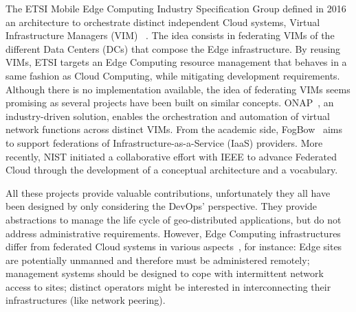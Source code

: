 


%
The ETSI Mobile Edge Computing Industry Specification Group
defined in 2016 an architecture to orchestrate distinct
independent Cloud systems, \aka Virtual
Infrastructure Managers (VIM) ~\cite{7574435}.
%
The idea consists in federating VIMs of the different Data Centers (DCs) that
compose the Edge infrastructure.  By reusing VIMs, ETSI targets an Edge
Computing resource management that behaves in a same fashion as Cloud
Computing, while mitigating development requirements.
%
Although there is no implementation available, the idea of federating
VIMs seems promising as several projects have been built on similar
concepts. ONAP~\cite{onap}, an industry-driven solution,
enables the orchestration and automation of virtual network functions
across distinct VIMs. From the academic side, FogBow~\cite{brasileiro2016fogbow} aims to support federations
of Infrastructure-as-a-Service (IaaS) providers. More recently, NIST
initiated a collaborative effort with IEEE to advance Federated
Cloud through the development of a conceptual architecture and a
vocabulary.

All these projects provide valuable contributions, unfortunately they all have
been designed by only considering the DevOps' perspective. They provide
abstractions to manage the life cycle of geo-distributed applications,
but do not address administrative requirements.
%
However, Edge Computing infrastructures differ from federated Cloud systems
in various aspects~\cite{openstack:whitepaper}, for instance:
Edge sites are potentially unmanned and therefore must be administered remotely;
management systems should be designed to cope with intermittent network access to sites; distinct operators might be interested in interconnecting their infrastructures (like network peering).
%

